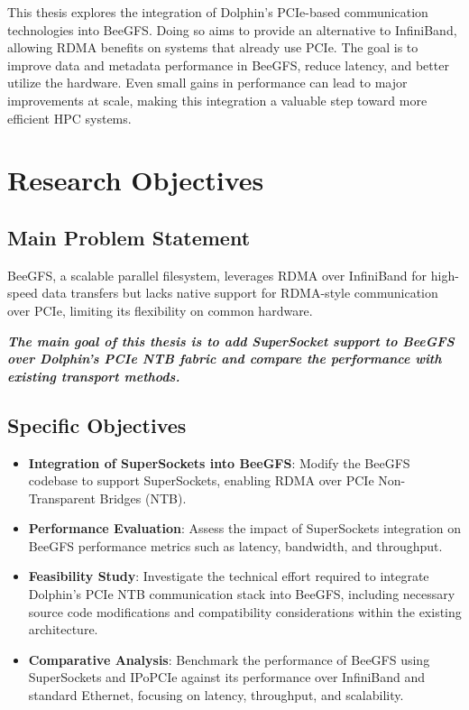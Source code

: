 This thesis explores the integration of Dolphin’s PCIe-based communication technologies into BeeGFS. Doing so aims to provide an alternative to InfiniBand, allowing RDMA benefits on systems that already use PCIe. The goal is to improve data and metadata performance in BeeGFS, reduce latency, and better utilize the hardware. Even small gains in performance can lead to major improvements at scale, making this integration a valuable step toward more efficient HPC systems.

\section{Research Objectives}
\subsection{Main Problem Statement}
BeeGFS, a scalable parallel filesystem, leverages RDMA over InfiniBand for high-speed data transfers but lacks native support for RDMA-style communication over PCIe, limiting its flexibility on common hardware.

\begin{center}
    \textbf{\textit{The main goal of this thesis is to add SuperSocket support to BeeGFS over Dolphin's PCIe NTB fabric and compare the performance with existing transport methods.}}
\end{center}

\subsection{Specific Objectives}
\begin{itemize}
    \item \textbf{Integration of SuperSockets into BeeGFS}: Modify the BeeGFS codebase to support SuperSockets, enabling RDMA over PCIe Non-Transparent Bridges \allowbreak(NTB).
    \item \textbf{Performance Evaluation}: Assess the impact of SuperSockets integration on BeeGFS performance metrics such as latency, bandwidth, and throughput.
    \item \textbf{Feasibility Study}: Investigate the technical effort required to integrate Dolphin’s PCIe NTB communication stack into BeeGFS, including necessary source code modifications and compatibility considerations within the existing architecture.
    
    \item \textbf{Comparative Analysis}: Benchmark the performance of BeeGFS using SuperSockets and IPoPCIe against its performance over InfiniBand and standard Ethernet, focusing on latency, throughput, and scalability.

\end{itemize}

